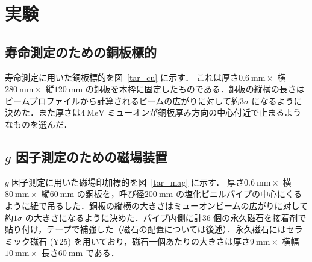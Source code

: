  



%

\section{実験}

\subsection{寿命測定のための銅板標的}

寿命測定に用いた銅板標的を図~\ref{tar_cu} に示す．
これは厚さ$0.6~\mathrm{mm} \times$ 横$280~\mathrm{mm} \times$ 縦$120~\mathrm{mm}$ の銅板を木枠に固定したものである．銅板の縦横の長さはビームプロファイルから計算されるビームの広がりに対して約$3\sigma$ になるように決めた．また厚さは$4~\mathrm{MeV}$ ミューオンが銅板厚み方向の中心付近で止まるようなものを選んだ．

\subsection{$g$ 因子測定のための磁場装置}

$g$ 因子測定に用いた磁場印加標的を図~\ref{tar_mag} に示す．
厚さ$0.6~\mathrm{mm} \times$ 横$80~\mathrm{mm} \times$ 縦$60~\mathrm{mm}$ の銅板を，呼び径$200~\mathrm{mm}$ の塩化ビニルパイプの中心にくるように紐で吊るした．銅板の縦横の大きさはミューオンビームの広がりに対して約$1\sigma$ の大きさになるように決めた．パイプ内側に計36 個の永久磁石を接着剤で貼り付け，テープで補強した（磁石の配置については後述）．永久磁石にはセラミック磁石 (Y25) を用いており，磁石一個あたりの大きさは厚さ$9~\mathrm{mm} \times$ 横幅$10~\mathrm{mm} \times$ 長さ$60~\mathrm{mm}$ である．

